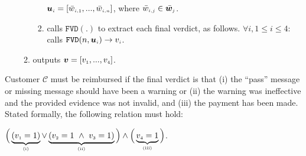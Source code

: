 \begin{enumerate}
\begin{enumerate}
\begin{enumerate}
  $\bm u_{\scriptscriptstyle i}=[\bar{w}_{\scriptscriptstyle i,1},...,\bar{w}_{\scriptscriptstyle i,n}]$, where $\bar{w}_{\scriptscriptstyle i,j}\in \bar {\bm w}_{\scriptscriptstyle j}$. 
%
\item calls $\mathtt{FVD}(.)$ to extract each final verdict, as follows. $\forall i, 1\leq i \leq 4:$ calls $\mathtt{FVD}(n,  {\bm u}_{\scriptscriptstyle i})\rightarrow  v_{\scriptscriptstyle i}$. 




%
%
%
%
\end{enumerate}
%

\item outputs $\bm v=[v_{\scriptscriptstyle 1},...,v_{\scriptscriptstyle 4}]$.

\end{enumerate}
\end{enumerate}
Customer $\mathcal{C}$ must be reimbursed if the final verdict is that (i)  the ``pass'' message or  missing message should have been a warning or (ii)  the warning was ineffective and the provided evidence was not invalid, and (iii) the payment has been made. Stated formally, the following relation must hold: 
%
\begin{center}
$\Big( \underbrace{(v_{\scriptscriptstyle 1}=1)}_{\scriptscriptstyle (\text{i})}\vee  \underbrace{(v_{\scriptscriptstyle 2}=1\ \wedge\ v_{\scriptscriptstyle 3}=1)}_{\scriptscriptstyle (\text {ii})}\Big)\wedge\Big(\underbrace{v_{\scriptscriptstyle 4}=1}_{\scriptscriptstyle (\text{iii})}\Big)$.
\end{center}
%
%
